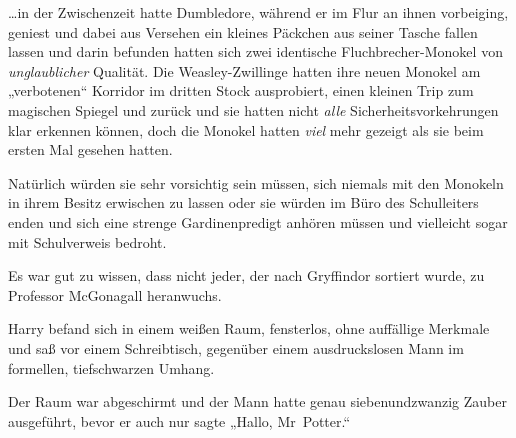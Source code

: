 …in der Zwischenzeit hatte Dumbledore, während er im Flur an ihnen vorbeiging, geniest und dabei aus Versehen ein kleines Päckchen aus seiner Tasche fallen lassen und darin befunden hatten sich zwei identische Fluchbrecher-Monokel von \emph{unglaublicher} Qualität. Die Weasley-Zwillinge hatten ihre neuen Monokel am „verbotenen“ Korridor im dritten Stock ausprobiert, einen kleinen Trip zum magischen Spiegel und zurück und sie hatten nicht \emph{alle} Sicherheitsvorkehrungen klar erkennen können, doch die Monokel hatten \emph{viel} mehr gezeigt als sie beim ersten Mal gesehen hatten.

Natürlich würden sie sehr vorsichtig sein müssen, sich niemals mit den Monokeln in ihrem Besitz erwischen zu lassen oder sie würden im Büro des Schulleiters enden und sich eine strenge Gardinenpredigt anhören müssen und vielleicht sogar mit Schulverweis bedroht.

Es war gut zu wissen, dass nicht jeder, der nach Gryffindor sortiert wurde, zu Professor McGonagall heranwuchs.

\later

Harry befand sich in einem weißen Raum, fensterlos, ohne auffällige Merkmale und saß vor einem Schreibtisch, gegenüber einem ausdruckslosen Mann im formellen, tiefschwarzen Umhang.

Der Raum war abgeschirmt und der Mann hatte genau siebenundzwanzig Zauber ausgeführt, bevor er auch nur sagte „Hallo, Mr~Potter.“

